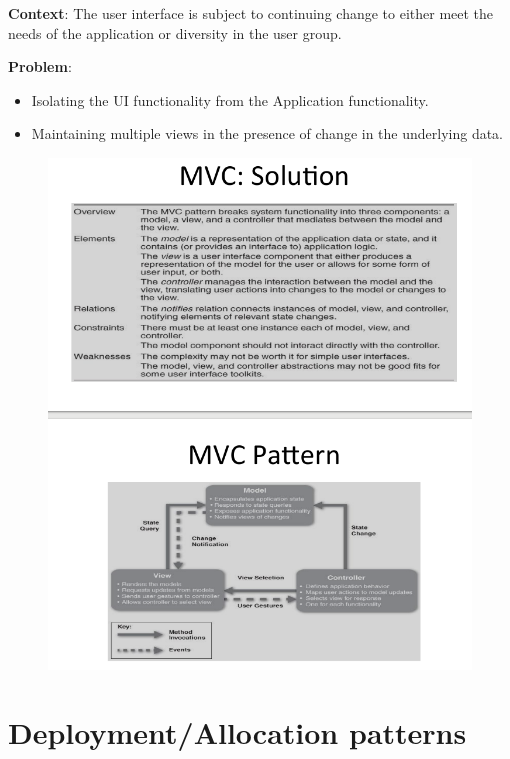 \documentclass[a4paper]{report}
\begin{document}
\textbf{Context}: The user interface is subject to continuing change to either
meet the needs of the application or diversity in the user group.

\textbf{Problem}:
\begin{itemize}
\item
  Isolating the UI functionality from the Application functionality.
\item
  Maintaining multiple views in the presence of change in the underlying data.
\end{itemize}


\begin{figure}[H]
\centering
  \includegraphics[width=1\linewidth]
  {images/mvc.png}
\end{figure}

\section{Deployment/Allocation patterns}

\end{document}
